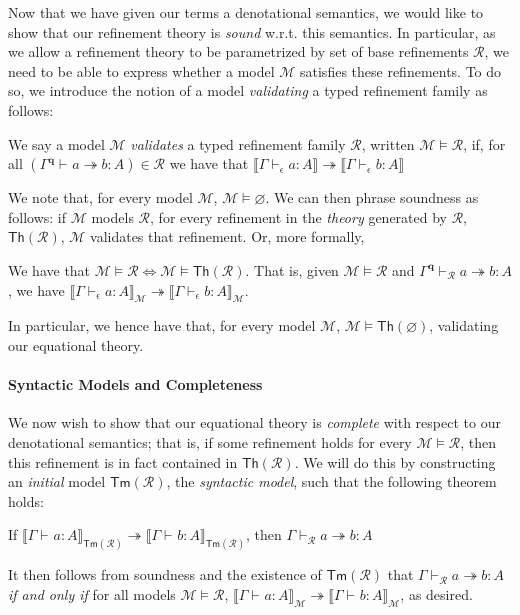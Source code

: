 \documentclass[acmsmall,screen,anonymous,review]{acmart}
\newcommand{\mc}[1]{\ensuremath{\mathcal{#1}}}
\newcommand{\mb}[1]{\ensuremath{\mathbf{#1}}}
\newcommand{\ms}[1]{\ensuremath{\mathsf{#1}}}
\newcommand{\hasty}[4]{#1 \vdash_{#2} #3: {#4}}
\newcommand{\tref}{\twoheadrightarrow}
\newcommand{\cref}{\twoheadrightarrow}
\newcommand{\tmle}[5]{#1 \vdash_{#2} #3 \tref #4 : {#5}}
\newcommand{\dnt}[1]{\llbracket{#1}\rrbracket}
\begin{document}
Now that we have given our terms a denotational semantics, we would like to show that our refinement
theory is \emph{sound} w.r.t. this semantics. In particular, as we allow a refinement theory to be
parametrized by set of base refinements $\mc{R}$, we need to be able to express whether a model
$\mc{M}$ satisfies these refinements. To do so, we introduce the notion of a model \emph{validating}
a typed refinement family as follows:
\begin{definition}
  We say a model $\mc{M}$ \emph{validates} a typed refinement family $\mc{R}$, written $\mc{M}
  \models \mc{R}$, if, for all
  $
  (\tmle{\Gamma^{\mb{q}}}{}{a}{b}{A}) \in \mc{R}
  $
  we have that
  $
  \dnt{\hasty{\Gamma}{\epsilon}{a}{A}} \tref \dnt{\hasty{\Gamma}{\epsilon}{b}{A}}
  $
\end{definition}
We note that, for every model $\mc{M}$, $\mc{M} \models \varnothing$. We can then phrase soundness
as follows: if $\mc{M}$ models $\mc{R}$, for every refinement in the \emph{theory} generated by
$\mc{R}$, $\ms{Th}(\mc{R})$, $\mc{M}$ validates that refinement. Or, more formally,
\begin{theorem}[Soundness]
  We have that $\mc{M} \models \mc{R} \iff \mc{M} \models \ms{Th}(\mc{R})$. That is, given $\mc{M}
  \models \mc{R}$ and $\tmle{\Gamma^{\mb{q}}}{\mc{R}}{a}{b}{A}$, we have
  $\dnt{\hasty{\Gamma}{\epsilon}{a}{A}}_{\mc{M}} \cref
  \dnt{\hasty{\Gamma}{\epsilon}{b}{A}}_{\mc{M}}$.
\end{theorem}
In particular, we hence have that, for every model $\mc{M}$, $\mc{M} \models \ms{Th}(\varnothing)$,
validating our equational theory.

\paragraph{Syntactic Models and Completeness}

We now wish to show that our equational theory is \emph{complete} with respect to our denotational
semantics; that is, if some refinement holds for every $\mc{M} \models \mc{R}$, then this refinement
is in fact contained in $\ms{Th}(\mc{R})$. We will do this by constructing an \emph{initial} model
$\ms{Tm}(\mc{R})$, the \emph{syntactic model}, such that the following theorem holds:
\begin{theorem}[Completeness]
  If $\dnt{\hasty{\Gamma}{}{a}{A}}_{\ms{Tm}(\mc{R})} \tref
  \dnt{\hasty{\Gamma}{}{b}{A}}_{\ms{Tm}(\mc{R})}$, then
  $
  \tmle{\Gamma}{\mc{R}}{a}{b}{A}
  $
\end{theorem}
It then follows from soundness and the existence of $\ms{Tm}(\mc{R})$ that
$\tmle{\Gamma}{\mc{R}}{a}{b}{A}$ \emph{if and only if} for all models $\mc{M} \models \mc{R}$,
$\dnt{\hasty{\Gamma}{}{a}{A}}_{\mc{M}} \tref \dnt{\hasty{\Gamma}{}{b}{A}}_{\mc{M}}$, as desired.
\end{document}
